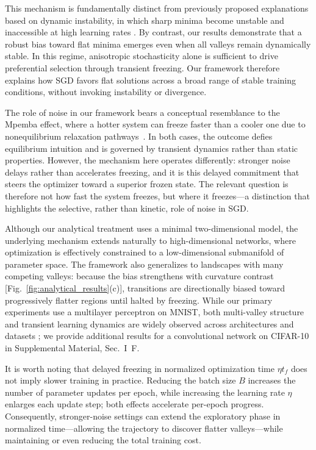 \documentclass[aps,prx,reprint,superscriptaddress,longbibliography,nofootinbib,floatfix]{revtex4-2}
\begin{document}
This mechanism is fundamentally distinct from previously proposed explanations based on dynamic instability, in which sharp minima become unstable and inaccessible at high learning rates \cite{wuHowSGDSelects2018}. By contrast, our results demonstrate that a robust bias toward flat minima emerges even when all valleys remain dynamically stable. In this regime, anisotropic stochasticity alone is sufficient to drive preferential selection through transient freezing. Our framework therefore explains how SGD favors flat solutions across a broad range of stable training conditions, without invoking instability or divergence.

The role of noise in our framework bears a conceptual resemblance to the Mpemba effect, where a hotter system can freeze faster than a cooler one due to nonequilibrium relaxation pathways~\cite{mpembaCool1969,auerbachSupercoolingMpembaEffect1995,brownridgeWhenDoesHot2011,luNonequilibriumThermodynamicsMarkovian2017}. In both cases, the outcome defies equilibrium intuition and is governed by transient dynamics rather than static properties. However, the mechanism here operates differently: stronger noise delays rather than accelerates freezing, and it is this delayed commitment that steers the optimizer toward a superior frozen state. The relevant question is therefore not how fast the system freezes, but where it freezes---a distinction that highlights the selective, rather than kinetic, role of noise in SGD.

Although our analytical treatment uses a minimal two-dimensional model, the underlying mechanism extends naturally to high-dimensional networks, where optimization is effectively constrained to a low-dimensional submanifold of parameter space. The framework also generalizes to landscapes with many competing valleys: because the bias strengthens with curvature contrast [Fig.~\ref{fig:analytical_results}(c)], transitions are directionally biased toward progressively flatter regions until halted by freezing. While our primary experiments use a multilayer perceptron on MNIST, both multi-valley structure and transient learning dynamics are widely observed across architectures and datasets \cite{fortLargeScaleStructure2019,garipovLossSurfacesMode2018,achilleCriticalLearningPeriods2019,jastrzebskiBreakEvenPointOptimization2020,kalraPhaseDiagramEarly2023}; we provide additional results for a convolutional network on CIFAR-10 in Supplemental Material, Sec.~I~F.

It is worth noting that delayed freezing in normalized optimization time $\eta t_f$ does not imply slower training in practice. Reducing the batch size $B$ increases the number of parameter updates per epoch, while increasing the learning rate $\eta$ enlarges each update step; both effects accelerate per-epoch progress. Consequently, stronger-noise settings can extend the exploratory phase in normalized time---allowing the trajectory to discover flatter valleys---while maintaining or even reducing the total training cost.
\end{document}

